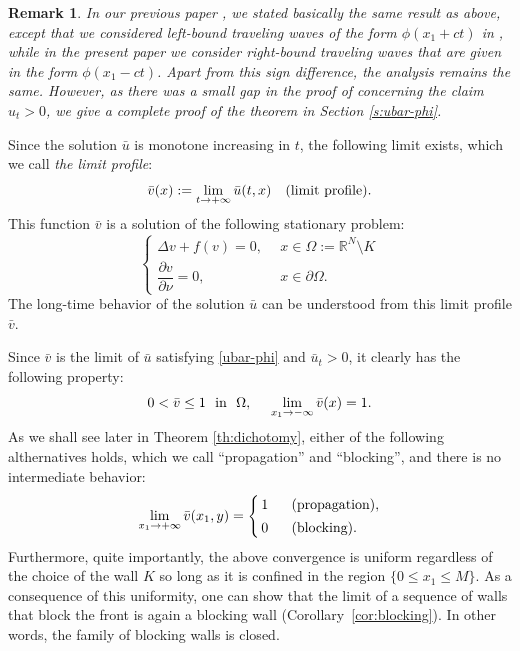 \documentclass[a4paper,12pt,fullpage]{article}
\numberwithin{equation}{section}
\newtheorem{Rk}[Lemma]{Remark}
\def\R{{\mathbb R}}
\begin{document}
\begin{Rk}\label{rk:Lemma1}
In our previous paper \cite[Theorem 2.1]{BHM1}, we stated basically the same result as above, except that we considered left-bound traveling waves of the form $\phi(x_1+ct)$ in \cite{BHM1}, while in the present paper we consider right-bound traveling waves that are given in the form $\phi(x_1-ct)$.  Apart from this sign difference, the analysis remains the same. However, as there was a small gap in the proof of \cite[Theorem 2.1]{BHM1} concerning the claim $u_t>0$, we give a complete proof of the theorem in Section \ref{s:ubar-phi}. 
\end{Rk}

Since the solution $\bar u$ is monotone increasing in $t$, the following limit exists, which we call {\it the limit profile}:
\begin{equation}\label{vbar}
\bar{v}(x):=\lim_{t\to+\infty} \bar u(t,x)\quad \hbox{(limit profile)}.
\end{equation}
This function $\bar{v}$ is a solution of the following stationary problem:
\begin{equation}\label{S}
\left\{
\begin{array}{ll}
\Delta v +f(v)=0, \ \ &x\in \Omega:=\R^N\setminus K \\[4pt]
\dfrac{\partial v}{\partial \nu} = 0, \ \ &x\in \partial\Omega.
\end{array}\right.
\end{equation}
The long-time behavior of the solution $\bar{u}$ can be understood from this limit profile $\bar{v}$.

Since $\bar{v}$ is the limit of $\bar{u}$ satisfying \eqref{ubar-phi} and $\bar{u}_t>0$, it clearly has the following property:
\begin{equation}\label{vbar-1}
0<\bar{v}\leq 1\ \ \hbox{in}\ \ \Omega,\quad\  \lim_{x_1\to -\infty}\bar{v}(x)=1.
\end{equation}
As we shall see later in Theorem \ref{th:dichotomy}, either of the following althernatives holds, which we call ``propagation'' and  ``blocking'', and there is no intermediate behavior:
\begin{equation}\label{pro-block}
\lim_{x_1\to +\infty} \bar{v}(x_1,y)=
\begin{cases}
\, 1\ \ & \hbox{\rm (propagation)},\\[2pt] 
\, 0\ \ &\hbox{\rm (blocking)}.
\end{cases}
\end{equation}
Furthermore, quite importantly, the above convergence is uniform regardless of the choice of the wall $K$ so long as it is confined in the region $\{0\leq x_1\leq M\}$. As a consequence of this uniformity, one can show that the limit of a sequence of walls that block the front is again a blocking wall (Corollary~\ref{cor:blocking}). In other words, the family of blocking walls is closed.
\end{document}
